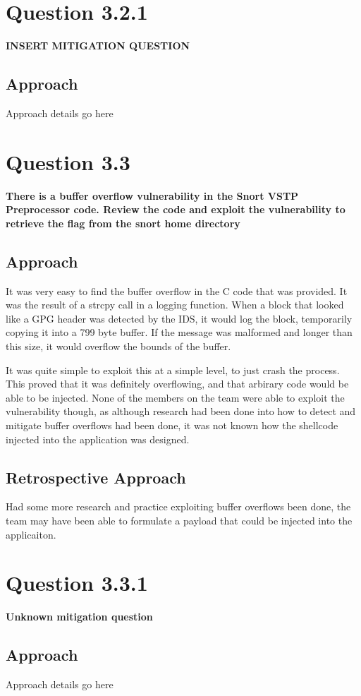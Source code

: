 \section{Question 3.2.1}
\textbf{INSERT MITIGATION QUESTION}
\subsection{Approach}
Approach details go here

\section{Question 3.3}
\textbf{There is a buffer overflow vulnerability in the Snort VSTP Preprocessor
code. Review the code and exploit the vulnerability to retrieve the flag from
the snort home directory}
\subsection{Approach}
It was very easy to find the buffer overflow in the C code that was provided.
It was the result of a strcpy call in a logging function. When a block that
looked like a GPG header was detected by the IDS, it would log the block,
temporarily copying it into a 799 byte buffer. If the message was malformed
and longer than this size, it would overflow the bounds of the buffer.

It was quite simple to exploit this at a simple level, to just crash the
process. This proved that it was definitely overflowing, and that arbirary
code would be able to be injected. None of the members on the team were
able to exploit the vulnerability though, as although research had been done
into how to detect and mitigate buffer overflows had been done, it was not
known how the shellcode injected into the application was designed.

\subsection{Retrospective Approach}
Had some more research and practice exploiting buffer overflows been done, the
team may have been able to formulate a payload that could be injected into
the applicaiton.

\section{Question 3.3.1}
\textbf{Unknown mitigation question}
\subsection{Approach}
Approach details go here
